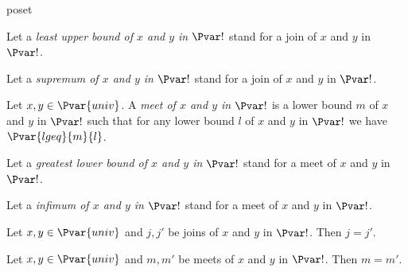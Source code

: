 \documentclass{stex}
\begin{document}
\begin{smodule}{poset}
\begin{forthel}
    Let a \emph{least upper bound of $x$ and $y$ in $\Pvar!$} stand for a join of $x$ and $y$ in $\Pvar!$.

    Let a \emph{supremum of $x$ and $y$ in $\Pvar!$} stand for a join of $x$ and $y$ in $\Pvar!$.

    \begin{definition}
      Let $x,y\in\Pvar{univ}$.
      A \emph{meet of $x$ and $y$ in $\Pvar!$} is a lower bound $m$ of $x$ and $y$ in $\Pvar!$ such that for any lower bound $l$ of $x$ and $y$ in $\Pvar!$ we have $\Pvar{lgeq}{m}{l}$.
    \end{definition}

    Let a \emph{greatest lower bound of $x$ and $y$ in $\Pvar!$} stand for a meet of $x$ and $y$ in $\Pvar!$.

    Let a \emph{infimum of $x$ and $y$ in $\Pvar!$} stand for a meet of $x$ and $y$ in $\Pvar!$.

    \begin{proposition}
      Let $x,y\in\Pvar{univ}$ and $j,j'$ be joins of $x$ and $y$ in $\Pvar!$.
      Then $j=j'$.
    \end{proposition}

    \begin{proposition}
      Let $x,y\in\Pvar{univ}$ and $m,m'$ be meets of $x$ and $y$ in $\Pvar!$.
      Then $m=m'$.
    \end{proposition}
  \end{forthel}
\end{smodule}
\end{document}
